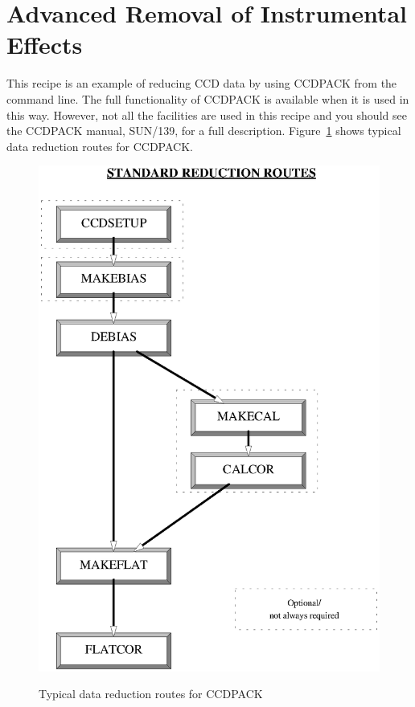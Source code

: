 \documentclass[twoside,11pt]{article}
\newcommand{\xref}[3]{#1}
\newcommand{\xlabel}[1]{}
\begin{document}
\newpage
\section{\xlabel{SOLUTION}\label{SOLUTION}Advanced Removal of Instrumental
Effects}

This recipe is an example of reducing CCD data by using CCDPACK from
the command line.  The full functionality of CCDPACK is available when
it is used in this way.  However, not all the facilities are used in this
recipe and you should see the CCDPACK manual,
\xref{SUN/139}{sun139}{}\/\cite{SUN139}, for a full description.
Figure~\ref{ROUTES} shows typical data reduction routes for CCDPACK.

\begin{figure}[htbp]
  \centering
  \includegraphics[totalheight=7in]{sc5_red.ps}
  \begin{quote}
  \caption{Typical data reduction routes for CCDPACK
  \label{ROUTES} }
  \end{quote}
\end{figure}
\end{document}
